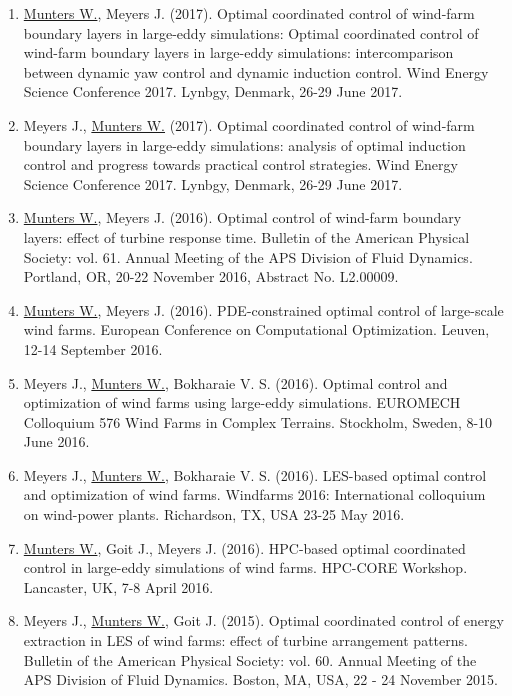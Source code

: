 \begin{enumerate}
\item \underline{Munters W.}, Meyers J. (2017). Optimal coordinated control of wind-farm boundary layers in large-eddy simulations: Optimal coordinated control of wind-farm boundary layers in large-eddy simulations: intercomparison between dynamic yaw control and dynamic induction control. Wind Energy Science Conference 2017. Lynbgy, Denmark, 26-29 June 2017.

\item Meyers J., \underline{Munters W.} (2017). Optimal coordinated control of wind-farm boundary layers in large-eddy simulations: analysis of optimal induction control and progress towards practical control strategies. Wind Energy Science Conference 2017. Lynbgy, Denmark, 26-29 June 2017.

\item \underline{Munters W.}, Meyers J. (2016). Optimal control of wind-farm boundary layers: effect of turbine response time. Bulletin of the American Physical Society: vol. 61. Annual Meeting of the APS Division of Fluid Dynamics. Portland, OR, 20-22 November 2016, Abstract No. L2.00009.

\item \underline{Munters W.}, Meyers J. (2016). PDE-constrained optimal control of large-scale wind farms. European Conference on Computational Optimization. Leuven, 12-14 September 2016.

\item Meyers J., \underline{Munters W.}, Bokharaie V. S. (2016). Optimal control and optimization of wind farms using large-eddy simulations. EUROMECH Colloquium 576 Wind Farms in Complex Terrains. Stockholm, Sweden, 8-10 June 2016.

\item Meyers J., \underline{Munters W.}, Bokharaie V. S. (2016). LES-based optimal control and optimization of wind farms. Windfarms 2016: International colloquium on wind-power plants. Richardson, TX, USA 23-25 May 2016.

\item \underline{Munters W.}, Goit J., Meyers J. (2016). HPC-based optimal coordinated control in large-eddy simulations of wind farms. HPC-CORE Workshop. Lancaster, UK, 7-8 April 2016.

\item Meyers J., \underline{Munters W.}, Goit J. (2015). Optimal coordinated control of energy extraction in LES of wind farms: effect of turbine arrangement patterns. Bulletin of the American Physical Society: vol. 60. Annual Meeting of the APS Division of Fluid Dynamics. Boston, MA, USA, 22 - 24 November 2015.


\end{enumerate}
